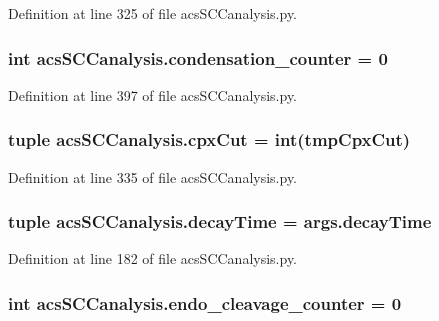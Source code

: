 Definition at line 325 of file acs\+S\+C\+Canalysis.\+py.

\hypertarget{a00130_a144441bdbe6e835849cf165ea2946848}{
\subsubsection[{condensation\+\_\+counter}]{\setlength{\rightskip}{0pt plus 5cm}int acs\+S\+C\+Canalysis.\+condensation\+\_\+counter = 0}}\label{a00130_a144441bdbe6e835849cf165ea2946848}


Definition at line 397 of file acs\+S\+C\+Canalysis.\+py.

\hypertarget{a00130_a06673ec4592e44a89a443073b8a29011}{
\subsubsection[{cpx\+Cut}]{\setlength{\rightskip}{0pt plus 5cm}tuple acs\+S\+C\+Canalysis.\+cpx\+Cut = int(tmp\+Cpx\+Cut)}}\label{a00130_a06673ec4592e44a89a443073b8a29011}


Definition at line 335 of file acs\+S\+C\+Canalysis.\+py.

\hypertarget{a00130_a29728f750a3b57770e836db8409767e9}{
\subsubsection[{decay\+Time}]{\setlength{\rightskip}{0pt plus 5cm}tuple acs\+S\+C\+Canalysis.\+decay\+Time = args.\+decay\+Time}}\label{a00130_a29728f750a3b57770e836db8409767e9}


Definition at line 182 of file acs\+S\+C\+Canalysis.\+py.

\hypertarget{a00130_af5702a39b502da88dde8c38417a0efbd}{
\subsubsection[{endo\+\_\+cleavage\+\_\+counter}]{\setlength{\rightskip}{0pt plus 5cm}int acs\+S\+C\+Canalysis.\+endo\+\_\+cleavage\+\_\+counter = 0}}\label{a00130_af5702a39b502da88dde8c38417a0efbd}


